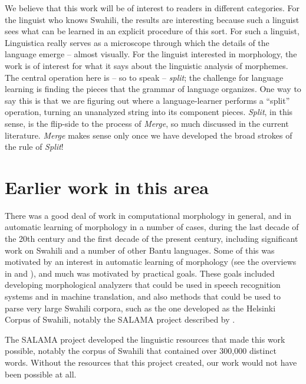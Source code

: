\documentclass[output=paper,colorlinks,citecolor=brown]{langscibook}
\begin{document}
We believe that this work will be of interest to readers in different categories. For the linguist who knows Swahili, the results are interesting because such a linguist sees what can be learned in an explicit procedure of this sort. For such a linguist, Linguistica really serves as a microscope through which the details of the language emerge -- almost visually. For the linguist interested in morphology, the work is of interest for what it says about the linguistic analysis of morphemes. The central operation here is -- so to speak -- \textit{split}; the challenge for language learning is finding the pieces that the grammar of language organizes. One way to say this is that we are figuring out where a language-learner performs a ``split'' operation, turning an unanalyzed string into its component pieces. \textit{Split}, in this sense, is the flip-side to the process of \textit{Merge}, so much discussed in the current literature. \textit{Merge} makes sense only once we have developed the broad strokes of the rule of \textit{Split}!


\section{Earlier work in this area}

There was a good deal of work in computational morphology in general, and in automatic learning of morphology in a number of cases, during the last decade of the 20th century and the first decade of the present century, including significant work on Swahili and a number of other Bantu languages. Some of this was motivated by an interest in automatic learning of morphology (see the overviews in \citealt{Goldsmith2010} and \citealt{GoldsmithEtAl2017}), and much was motivated by practical goals. These goals included developing morphological analyzers that could be used in speech recognition systems and in machine translation, and also methods that could be used to parse very large Swahili corpora, such as the one developed as the Helsinki Corpus of Swahili, notably the SALAMA project described by \citet{Hurskainen1992, Hurskainen1999, Hurskainen2004Compilers}. 

\begin{sloppypar}
The SALAMA project developed the linguistic resources that made this work possible, notably the corpus of Swahili that contained over 300,000 distinct words. Without the resources that this project created, our work would not have been possible at all. 
\end{sloppypar}
\end{document}
